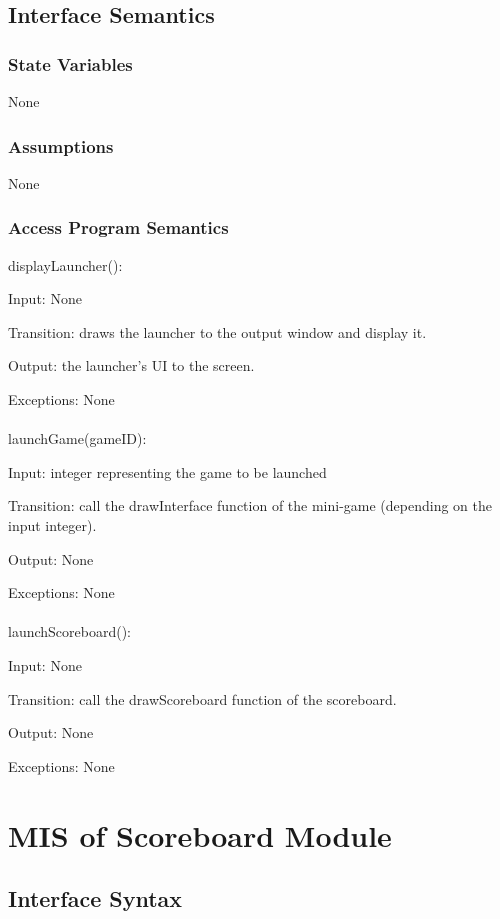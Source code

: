 \documentclass[12pt, titlepage]{article}
\begin{document}
		\subsection{Interface Semantics}
		\subsubsection{State Variables}
		None
		\subsubsection{Assumptions}
		None
		\subsubsection{Access Program Semantics}
		
		displayLauncher():
		
		Input: None
		
		Transition: draws the launcher to the output window and display it.
		
		Output: the launcher's UI to the screen.
		
		Exceptions: None\\
		\\
		launchGame(gameID):
		
		Input: integer representing the game to be launched
		
		Transition: call the drawInterface function of the mini-game (depending on the input integer).
		
		Output: None
		
		Exceptions: None\\
		\\
		launchScoreboard():
		
		Input: None
		
		Transition: call the drawScoreboard function of the scoreboard.
		
		Output: None
		
		Exceptions: None
	
	

\section{MIS of Scoreboard Module}
		\subsection{Interface Syntax}
\end{document}
